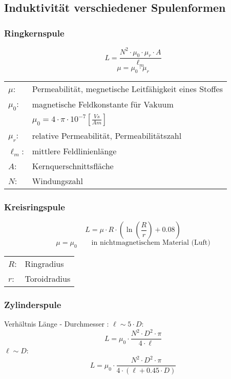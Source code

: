 



\subsection{Induktivität verschiedener Spulenformen}

\subsubsection{Ringkernspule}
\[ L = \frac{N^2 \cdot \mu_0 \cdot \mu_r \cdot A}{\ell_m} \]
\[ \mu = \mu_0 \cdot \mu_r \]
\begin{tabular}{@{}ll}
  $\mu$:    & Permeabilität, megnetische Leitfähigkeit eines Stoffes \\
  $\mu_0$:  & magnetische Feldkonstante für Vakuum \\
            & $\mu_0 = 4 \cdot \pi \cdot 10^{-7} \left[\frac{Vs}{Am}\right]$ \\
  $\mu_r$:  & relative Permeabilität, Permeabilitätszahl \\
  $\ell_m$: & mittlere Feldlinienlänge \\
  $A$:      & Kernquerschnittsfläche \\
  $N$:      & Windungszahl
\end{tabular}

\subsubsection{Kreisringspule}
\[ L = \mu \cdot R \cdot \left(\ln\left(\frac{R}{r}\right) + 0.08\right) \]
\[ \mu = \mu_0 \qquad \text{in nichtmagnetischem Material (Luft)} \]
\begin{tabular}{@{}ll}
  $R$:  & Ringradius \\
  $r$:  & Toroidradius 
\end{tabular}

\subsubsection{Zylinderspule}
Verhältnis Länge - Durchmesser : $\ell \sim 5 \cdot D$:
\[ L = \mu_0 \cdot \frac{N^2 \cdot D^2 \cdot \pi}{4 \cdot \ell} \]
$\ell \sim D$:
\[ L = \mu_0 \cdot \frac{N^2 \cdot D^2 \cdot \pi}{4 \cdot (\ell + 0.45 \cdot D)} \]
